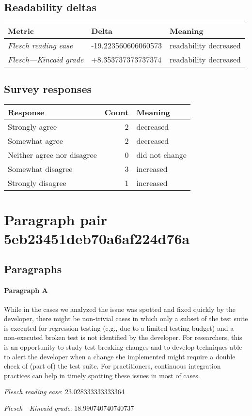 \subsection{Readability deltas}

\begin{tabular}{lll}
\toprule
               \textbf{Metric} &       \textbf{Delta} &       \textbf{Meaning} \\
\midrule
    \emph{Flesch reading ease} &  -19.223560606060573 &  readability decreased \\
 \emph{Flesch---Kincaid grade} &   +8.353737373737374 &  readability decreased \\
\bottomrule
\end{tabular}

\subsection{Survey responses}
\begin{tabular}{lrl}
\toprule
          \textbf{Response} &  \textbf{Count} & \textbf{Meaning} \\
\midrule
             Strongly agree &               2 &        decreased \\
             Somewhat agree &               2 &        decreased \\
 Neither agree nor disagree &               0 &   did not change \\
          Somewhat disagree &               3 &        increased \\
          Strongly disagree &               1 &        increased \\
\bottomrule
\end{tabular}

\section{Paragraph pair 5eb23451deb70a6af224d76a}
\subsection{Paragraphs}
\paragraph{Paragraph A}
While in the cases we analyzed the issue was spotted and fixed quickly by the developer, there might be non-trivial cases in which only a subset of the test suite is executed for regression testing (e.g., due to a limited testing budget) and a non-executed broken test is not identified by the developer. For researchers, this is an opportunity to study test breaking-changes and to develop techniques able to alert the developer when a change she implemented might require a double check of (part of) the test suite. For practitioners, continuous integration practices can help in timely spotting these issues in most of cases.\par\medskip\emph{Flesch reading ease}: 23.028333333333364\par\emph{Flesch---Kincaid grade}: 18.990740740740737

